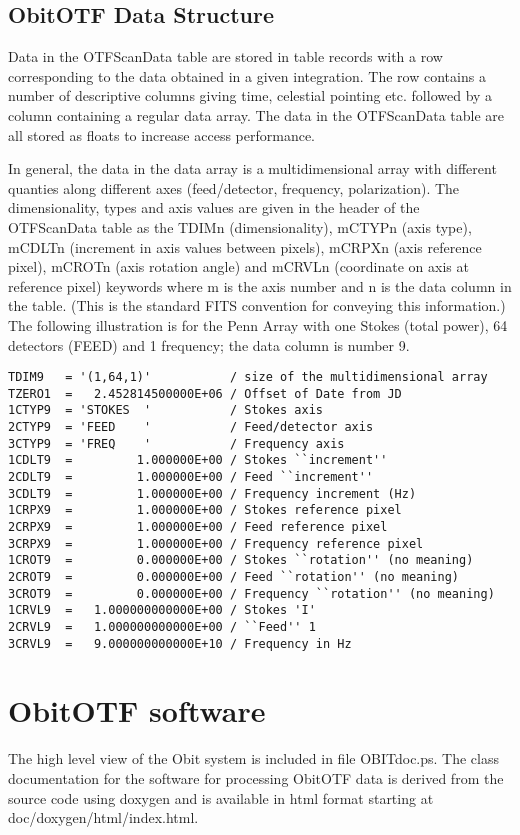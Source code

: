 \documentclass[11pt]{article}
\begin{document}
\subsection{ObitOTF Data Structure}
Data in the OTFScanData table are stored in table records with a row
corresponding to the data obtained in a given integration.
The row contains a number of descriptive columns giving time,
celestial pointing etc. followed by a column containing a regular data
array.
The data in the OTFScanData table are all stored as floats to increase
access performance.

In general, the data in the data array is a multidimensional array with
different quanties along different axes (feed/detector, frequency,
polarization). 
The dimensionality, types and axis values are given in the header of
the OTFScanData table as the TDIMn (dimensionality), mCTYPn (axis
type), mCDLTn (increment in axis values between pixels), mCRPXn (axis
reference pixel), mCROTn (axis rotation angle) and mCRVLn (coordinate
on axis at reference pixel) keywords where m is the axis number and n
is the data column in the table.
(This is the standard FITS convention for conveying this information.)
The following illustration is for the Penn Array with one Stokes
(total power), 64 detectors (FEED) and 1 frequency; the data column is
number 9.
\begin{verbatim}
TDIM9   = '(1,64,1)'           / size of the multidimensional array
TZERO1  =   2.452814500000E+06 / Offset of Date from JD
1CTYP9  = 'STOKES  '           / Stokes axis
2CTYP9  = 'FEED    '           / Feed/detector axis
3CTYP9  = 'FREQ    '           / Frequency axis
1CDLT9  =         1.000000E+00 / Stokes ``increment''
2CDLT9  =         1.000000E+00 / Feed ``increment''
3CDLT9  =         1.000000E+00 / Frequency increment (Hz)
1CRPX9  =         1.000000E+00 / Stokes reference pixel
2CRPX9  =         1.000000E+00 / Feed reference pixel
3CRPX9  =         1.000000E+00 / Frequency reference pixel
1CROT9  =         0.000000E+00 / Stokes ``rotation'' (no meaning)
2CROT9  =         0.000000E+00 / Feed ``rotation'' (no meaning)
3CROT9  =         0.000000E+00 / Frequency ``rotation'' (no meaning)
1CRVL9  =   1.000000000000E+00 / Stokes 'I'
2CRVL9  =   1.000000000000E+00 / ``Feed'' 1
3CRVL9  =   9.000000000000E+10 / Frequency in Hz
\end{verbatim}


\section{ObitOTF software}
The high level view of the Obit system is included in file
OBITdoc.ps.
The class documentation for the software for processing ObitOTF data
is derived from the source code using doxygen and is available
in html format starting at doc/doxygen/html/index.html.
\end{document}
